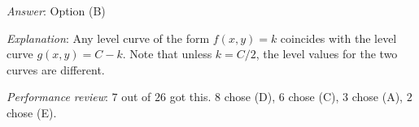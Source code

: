 \documentclass[10pt]{amsart}
\begin{document}
\begin{enumerate}
  {\em Answer}: Option (B)

  {\em Explanation}: Any level curve of the form $f(x,y) = k$
  coincides with the level curve $g(x,y) = C - k$. Note that unless $k
  = C/2$, the level values for the two curves are different.

  {\em Performance review}: $7$ out of $26$ got this. $8$ chose (D),
  $6$ chose (C), $3$ chose (A), $2$ chose (E).
\end{enumerate}
\end{document}
